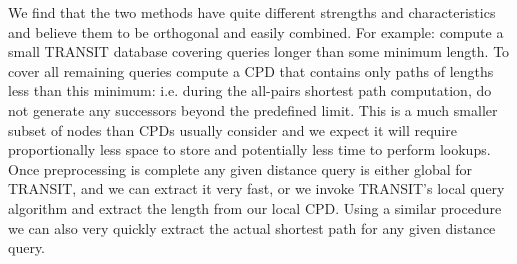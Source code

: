 We find that the two methods have quite different strengths and characteristics and believe them to be
orthogonal and easily combined.
For example: compute a small TRANSIT database covering queries longer than some minimum length.
To cover all remaining queries compute a CPD that contains only paths of lengths less than this minimum: i.e.
during the all-pairs shortest path computation, do not generate any successors beyond the predefined limit.
This is a much smaller subset of nodes than CPDs usually consider and we expect it will require
proportionally less space to store and potentially less time to perform lookups.
Once preprocessing is complete any given distance query is either global for TRANSIT, and we can extract
it very fast, or we invoke TRANSIT's local query algorithm and extract the length from our local CPD.
Using a similar procedure we can also very quickly extract the actual shortest path for any given
distance query.

